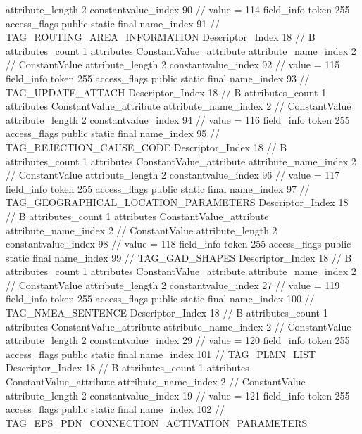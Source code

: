 {{{{{{{					attribute_length	2
					constantvalue_index	90		// value = 114
				}
				}
			}
			field_info {
				token	255
				access_flags	public static final
				name_index	91		// TAG_ROUTING_AREA_INFORMATION
				Descriptor_Index	18		// B
				attributes_count	1
				attributes {
				ConstantValue_attribute {
					attribute_name_index	2		// ConstantValue
					attribute_length	2
					constantvalue_index	92		// value = 115
				}
				}
			}
			field_info {
				token	255
				access_flags	public static final
				name_index	93		// TAG_UPDATE_ATTACH
				Descriptor_Index	18		// B
				attributes_count	1
				attributes {
				ConstantValue_attribute {
					attribute_name_index	2		// ConstantValue
					attribute_length	2
					constantvalue_index	94		// value = 116
				}
				}
			}
			field_info {
				token	255
				access_flags	public static final
				name_index	95		// TAG_REJECTION_CAUSE_CODE
				Descriptor_Index	18		// B
				attributes_count	1
				attributes {
				ConstantValue_attribute {
					attribute_name_index	2		// ConstantValue
					attribute_length	2
					constantvalue_index	96		// value = 117
				}
				}
			}
			field_info {
				token	255
				access_flags	public static final
				name_index	97		// TAG_GEOGRAPHICAL_LOCATION_PARAMETERS
				Descriptor_Index	18		// B
				attributes_count	1
				attributes {
				ConstantValue_attribute {
					attribute_name_index	2		// ConstantValue
					attribute_length	2
					constantvalue_index	98		// value = 118
				}
				}
			}
			field_info {
				token	255
				access_flags	public static final
				name_index	99		// TAG_GAD_SHAPES
				Descriptor_Index	18		// B
				attributes_count	1
				attributes {
				ConstantValue_attribute {
					attribute_name_index	2		// ConstantValue
					attribute_length	2
					constantvalue_index	27		// value = 119
				}
				}
			}
			field_info {
				token	255
				access_flags	public static final
				name_index	100		// TAG_NMEA_SENTENCE
				Descriptor_Index	18		// B
				attributes_count	1
				attributes {
				ConstantValue_attribute {
					attribute_name_index	2		// ConstantValue
					attribute_length	2
					constantvalue_index	29		// value = 120
				}
				}
			}
			field_info {
				token	255
				access_flags	public static final
				name_index	101		// TAG_PLMN_LIST
				Descriptor_Index	18		// B
				attributes_count	1
				attributes {
				ConstantValue_attribute {
					attribute_name_index	2		// ConstantValue
					attribute_length	2
					constantvalue_index	19		// value = 121
				}
				}
			}
			field_info {
				token	255
				access_flags	public static final
				name_index	102		// TAG_EPS_PDN_CONNECTION_ACTIVATION_PARAMETERS
}}}}}
